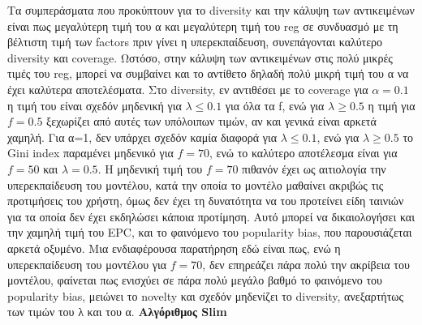 Τα συμπεράσματα που προκύπτουν για το diversity και την κάλυψη των αντικειμένων είναι πως μεγαλύτερη τιμή του α και μεγαλύτερη τιμή του reg σε συνδυασμό με τη βέλτιστη τιμή των factors πριν γίνει η υπερεκπαίδευση, συνεπάγονται καλύτερο diversity και coverage. Ωστόσο, στην κάλυψη των αντικειμένων στις πολύ μικρές τιμές του reg, μπορεί να συμβαίνει και το αντίθετο δηλαδή πολύ μικρή τιμή του α να έχει καλύτερα αποτελέσματα. Στο diversity, εν αντιθέσει με το coverage για $ α=0.1 $ η τιμή του είναι σχεδόν μηδενική για $ λ \leq 0.1 $ για όλα τα f, ενώ για $ λ \geq 0.5 $ η τιμή για $ f=0.5 $ ξεχωρίζει από αυτές των υπόλοιπων τιμών, αν και γενικά είναι αρκετά χαμηλή. Για α=1, δεν υπάρχει σχεδόν καμία διαφορά για $  λ\leq0.1 $, ενώ για $  λ\geq0.5 $ το Gini index παραμένει μηδενικό για $ f=70 $, ενώ το καλύτερο αποτέλεσμα είναι για $ f=50 $ και $  λ=0.5 $. Η μηδενική τιμή του $  f=70 $ πιθανόν έχει ως αιτιολογία την υπερεκπαίδευση του μοντέλου, κατά την οποία το μοντέλο μαθαίνει ακριβώς τις προτιμήσεις του χρήστη, όμως δεν έχει τη δυνατότητα να του προτείνει είδη ταινιών για τα οποία δεν έχει εκδηλώσει κάποια προτίμηση. Αυτό μπορεί να δικαιολογήσει και την χαμηλή τιμή του EPC, και το φαινόμενο του popularity bias, που παρουσιάζεται αρκετά οξυμένο. Μια ενδιαφέρουσα παρατήρηση εδώ είναι πως, ενώ η υπερεκπαίδευση του μοντέλου για $ f=70 $, δεν επηρεάζει πάρα πολύ την ακρίβεια του μοντέλου, φαίνεται πως ενισχύει σε πάρα πολύ μεγάλο βαθμό το φαινόμενο του popularity bias, μειώνει το novelty και σχεδόν μηδενίζει το diversity, ανεξαρτήτως των τιμών του λ και του α.
\newpage
\noindent\textbf{Αλγόριθμος Slim}\\
